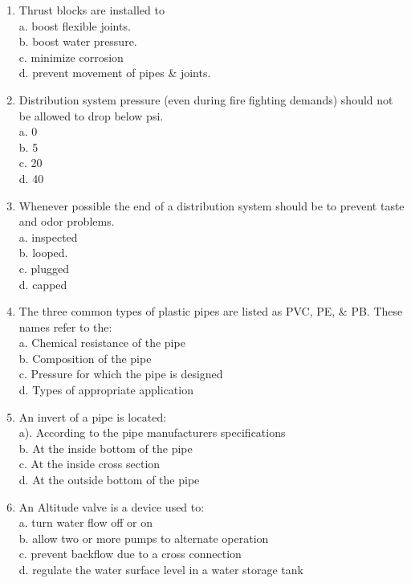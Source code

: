 \begin{enumerate}[1.]
\item Thrust blocks are installed to\\
a. boost flexible joints.\\
b. boost water pressure.\\
c. minimize corrosion\\
d. prevent movement of pipes \& joints.\\
\item Distribution system pressure (even during fire fighting demands) should not be allowed to drop below psi.\\
a. 0\\
b. 5\\
c. 20\\
d. 40\\
\item Whenever possible the end of a distribution system should be to prevent taste and odor problems.\\
a. inspected\\
b. looped.\\
c. plugged\\
d. capped\\
\item The three common types of plastic pipes are listed as PVC, PE, \& PB. These names refer to the:\\
a. Chemical resistance of the pipe\\
b. Composition of the pipe\\
c. Pressure for which the pipe is designed\\
d. Types of appropriate application\\
\item An invert of a pipe is located:\\
a). According to the pipe manufacturers specifications\\
b. At the inside bottom of the pipe\\
c. At the inside cross section\\
d. At the outside bottom of the pipe\\
\item An Altitude valve is a device used to:\\
a. turn water flow off or on\\
b. allow two or more pumps to alternate operation\\
c. prevent backflow due to a cross connection\\
d. regulate the water surface level in a water storage tank\\

\end{enumerate}
